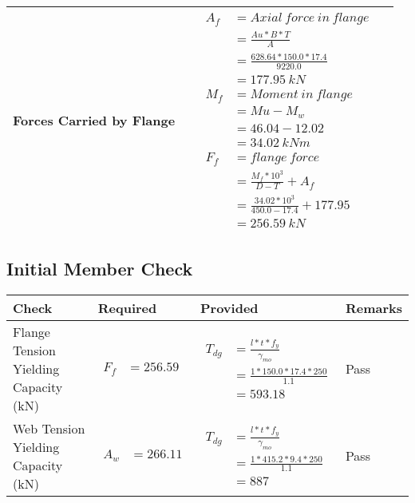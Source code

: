 \documentclass{article}%
\begin{document}
\begin{longtable}{|p{4cm}|p{3.5cm}|p{6.5cm}|p{1.5cm}|}
\hline%
Forces Carried by Flange&&$\begin{aligned} A_f&= Axial~force~ in ~flange  \\ &= \frac{Au * B *T}{A} \\ &= \frac{628.64 * 150.0*17.4}{9220.0} \\ &=177.95~ kN\\ M_f& =Moment~ in~ flange \\  & = Mu-M_w\\ &= 46.04-12.02\\ &=34.02~{kNm}\\  F_f& =flange~force  \\ & = \frac{M_f *10^3}{D-T} + A_f \\ &= \frac{34.02* 10^3}{450.0-17.4} +177.95 \\ &=256.59~kN \end{aligned}$&\\%
\hline%
\end{longtable}

%
\newpage%
\subsection{Initial Member Check}%
\label{subsec:InitialMemberCheck}%
\renewcommand{\arraystretch}{1.2}%
\begin{longtable}{|p{3cm}|p{4.5cm}|p{6.5cm}|p{1.5cm}|}%
\hline%
\rowcolor{OsdagGreen}%
Check&Required&Provided&Remarks\\%
\hline%
\endhead%
\hline%
Flange Tension Yielding Capacity (kN)&$\begin{aligned} F_f &=256.59\end{aligned}$&$\begin{aligned} T_{dg} &= \frac{l*t*f_y}{\gamma_{mo}}\\ &=\frac{1*150.0*17.4*250}{1.1}\\ &=593.18\end{aligned}$&Pass\\%
\hline%
Web Tension Yielding Capacity (kN)&$\begin{aligned} A_w &=266.11\end{aligned}$&$\begin{aligned} T_{dg} &= \frac{l*t*f_y}{\gamma_{mo}}\\ &=\frac{1*415.2*9.4*250}{1.1}\\ &=887\end{aligned}$&Pass\\%
\hline%
\end{longtable}
\end{document}
